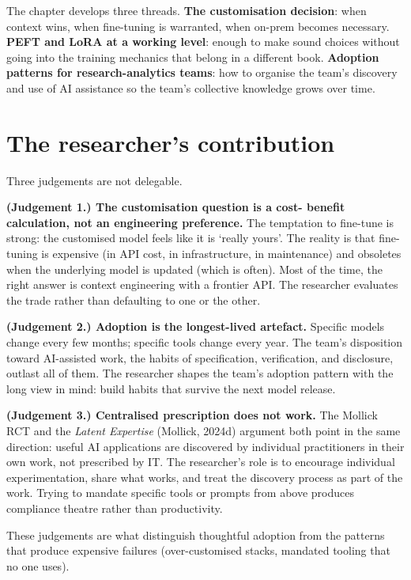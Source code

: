 \documentclass[
  letterpaper,
  11pt]{scrbook}
\begin{document}
The chapter develops three threads. \textbf{The customisation decision}:
when context wins, when fine-tuning is warranted, when on-prem becomes
necessary. \textbf{PEFT and LoRA at a working level}: enough to make
sound choices without going into the training mechanics that belong in a
different book. \textbf{Adoption patterns for research-analytics teams}:
how to organise the team's discovery and use of AI assistance so the
team's collective knowledge grows over time.

\section{The researcher's
contribution}\label{sec-customisation-teams-human}

Three judgements are not delegable.

\textbf{(Judgement 1.) The customisation question is a cost- benefit
calculation, not an engineering preference.} The temptation to fine-tune
is strong: the customised model feels like it is `really yours'. The
reality is that fine-tuning is expensive (in API cost, in
infrastructure, in maintenance) and obsoletes when the underlying model
is updated (which is often). Most of the time, the right answer is
context engineering with a frontier API. The researcher evaluates the
trade rather than defaulting to one or the other.

\textbf{(Judgement 2.) Adoption is the longest-lived artefact.} Specific
models change every few months; specific tools change every year. The
team's disposition toward AI-assisted work, the habits of specification,
verification, and disclosure, outlast all of them. The researcher shapes
the team's adoption pattern with the long view in mind: build habits
that survive the next model release.

\textbf{(Judgement 3.) Centralised prescription does not work.} The
Mollick RCT and the \emph{Latent Expertise} (Mollick, 2024d) argument
both point in the same direction: useful AI applications are discovered
by individual practitioners in their own work, not prescribed by IT. The
researcher's role is to encourage individual experimentation, share what
works, and treat the discovery process as part of the work. Trying to
mandate specific tools or prompts from above produces compliance theatre
rather than productivity.

These judgements are what distinguish thoughtful adoption from the
patterns that produce expensive failures (over-customised stacks,
mandated tooling that no one uses).
\end{document}
